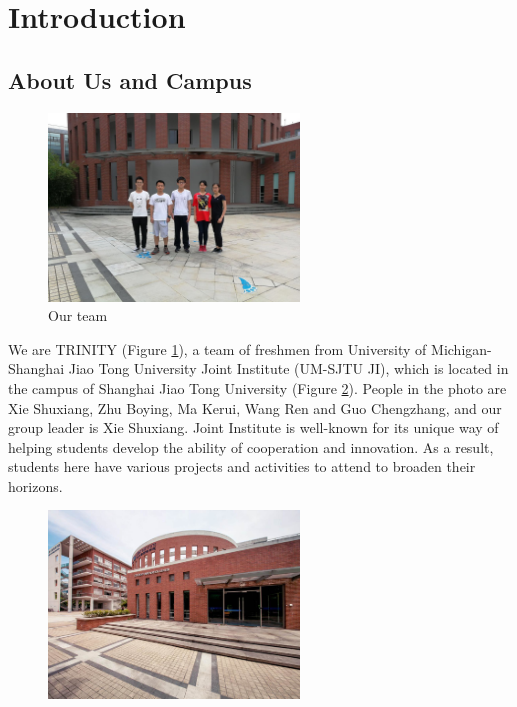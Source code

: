 \section{Introduction}

\subsection{About Us and Campus}

\begin{figure}[htbp]
\centering
\includegraphics[height=5cm]{figure/teamMember}
  \caption{Our team \label{fig:teamMember}}
\end{figure}

We are TRINITY (Figure \ref{fig:teamMember}), a team of freshmen from University of
Michigan-Shanghai Jiao Tong University Joint Institute (UM-SJTU JI), which is
located in the campus of Shanghai Jiao Tong University (Figure
\ref{fig:campus}). People in the photo are Xie Shuxiang, Zhu Boying, Ma Kerui,
Wang Ren and Guo Chengzhang, and our group leader is Xie Shuxiang. Joint
Institute is well-known for its unique way of helping students develop the
ability of cooperation and innovation. As a result, students here have various
projects and activities to attend to broaden their horizons.  


\begin{figure}[htbp]
\centering
\includegraphics[height=5cm]{figure/campus}
  \caption{\label{fig:campus}}
\end{figure}

